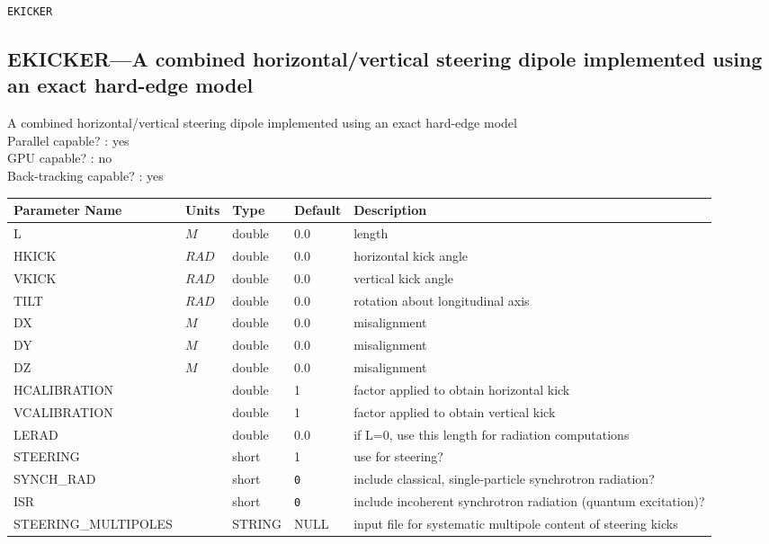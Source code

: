 \vspace*{0.5in}

\newpage
\begin{center}{\Large\verb|EKICKER|}\end{center}
\subsection{EKICKER---A combined horizontal/vertical steering dipole implemented using an exact hard-edge model}
A combined horizontal/vertical steering dipole implemented using an exact hard-edge model
\\
Parallel capable? : yes\\
GPU capable? : no\\
Back-tracking capable? : yes\\
\begin{tabular}{|l|l|l|l|p{\descwidth}|} \hline
Parameter Name & Units & Type & Default & Description \\ \hline 
L & $M$ & double &  0.0 & length  \\ \hline 
HKICK & $RAD$ & double &  0.0 & horizontal kick angle  \\ \hline 
VKICK & $RAD$ & double &  0.0 & vertical kick angle  \\ \hline 
TILT & $RAD$ & double &  0.0 & rotation about longitudinal axis  \\ \hline 
DX & $M$ & double &  0.0 & misalignment  \\ \hline 
DY & $M$ & double &  0.0 & misalignment  \\ \hline 
DZ & $M$ & double &  0.0 & misalignment  \\ \hline 
HCALIBRATION &  & double &   1 & factor applied to obtain horizontal kick  \\ \hline 
VCALIBRATION &  & double &   1 & factor applied to obtain vertical kick  \\ \hline 
LERAD &  & double &  0.0 & if L=0, use this length for radiation computations  \\ \hline 
STEERING &  & short &   1               & use for steering?  \\ \hline 
SYNCH\_RAD &  & short &  \verb|0| & include classical, single-particle synchrotron radiation?  \\ \hline 
ISR &  & short &  \verb|0| & include incoherent synchrotron radiation (quantum excitation)?  \\ \hline 
STEERING\_MULTIPOLES &  & STRING &   NULL            & input file for systematic multipole content of steering kicks  \\ \hline 

\end{tabular}
